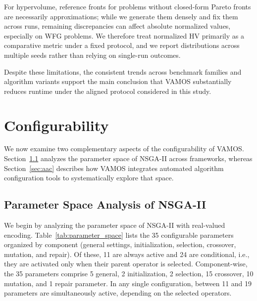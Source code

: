 \documentclass[final,5p,times,twocolumn]{elsarticle}
\newcommand{\VAMOS}{VAMOS}
\begin{document}
For hypervolume, reference fronts for problems without closed-form Pareto fronts are necessarily approximations; while we generate them densely and fix them across runs, remaining discrepancies can affect absolute normalized values, especially on WFG problems. We therefore treat normalized HV primarily as a comparative metric under a fixed protocol, and we report distributions across multiple seeds rather than relying on single-run outcomes.

Despite these limitations, the consistent trends across benchmark families and algorithm variants support the main conclusion that \VAMOS{} substantially reduces runtime under the aligned protocol considered in this study.

\section{Configurability}
\label{sec:configurability}
We now examine two complementary aspects of the configurability of \VAMOS{}. Section~\ref{sec:parameter_space} analyzes the parameter space of NSGA-II across frameworks, whereas Section~\ref{sec:aac} describes how \VAMOS{} integrates automated algorithm configuration tools to systematically explore that space.

\subsection{Parameter Space Analysis of NSGA-II}
\label{sec:parameter_space}
We begin by analyzing the parameter space of NSGA-II with real-valued encoding. Table~\ref{tab:parameter_space} lists the 35 configurable parameters organized by component (general settings, initialization, selection, crossover, mutation, and repair). Of these, 11 are always active and 24 are conditional, i.e., they are activated only when their parent operator is selected. Component-wise, the 35 parameters comprise 5 general, 2 initialization, 2 selection, 15 crossover, 10 mutation, and 1 repair parameter. In any single configuration, between 11 and 19 parameters are simultaneously active, depending on the selected operators.
\end{document}
